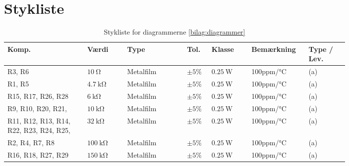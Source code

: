 \chapter{Stykliste} \label{bilag:styklister}

\begin{table}[h!]
\small
\caption{Stykliste for diagrammerne \ref{bilag:diagrammer}}
\label{tab:styklister}
\begin{threeparttable}
\begin{tabular}{p{0.2\linewidth}p{0.1\linewidth}p{0.15\linewidth}p{0.05\linewidth}p{0.1\linewidth}p{0.1\linewidth}p{0.1\linewidth}}
\toprule
\multicolumn{1}{l}{\textbf{Komp.}}       &
\multicolumn{1}{l}{\textbf{Værdi}}       &
\multicolumn{1}{l}{\textbf{Type}}       &
\multicolumn{1}{l}{\textbf{Tol.}} &
\multicolumn{1}{l}{\textbf{Klasse}} &
\multicolumn{1}{l}{\textbf{Bemærkning}} &
\multicolumn{1}{l}{\textbf{Type / Lev.}}  \\ 
\hline
R3, R6 & $\SI{10}{\ohm}$			& Metalfilm	& $\pm 5\%$ 		 & $\SI{0.25}{\watt}$	  & 100ppm/\si{\celsius}  & (a) \\
R1, R5 & $\SI{4.7}{\kilo\ohm}$			& Metalfilm	& $\pm 5\%$ 		 & $\SI{0.25}{\watt}$	  & 100ppm/\si{\celsius}  & (a) \\
R15, R17, R26, R28 & $\SI{6}{\kilo\ohm}$			& Metalfilm	& $\pm 5\%$ 		 & $\SI{0.25}{\watt}$	  & 100ppm/\si{\celsius}  & (a) \\
R9, R10, R20, R21,  & $\SI{10}{\kilo\ohm}$			& Metalfilm	& $\pm 5\%$ 		 & $\SI{0.25}{\watt}$	  & 100ppm/\si{\celsius}  & (a) \\
R11, R12, R13, R14, R22, R23, R24, R25, & $\SI{32}{\kilo\ohm}$			& Metalfilm	& $\pm 5\%$ 		 & $\SI{0.25}{\watt}$	  & 100ppm/\si{\celsius}  & (a) \\
R2, R4, R7, R8 & $\SI{100}{\kilo\ohm}$			& Metalfilm	& $\pm 5\%$ 		 & $\SI{0.25}{\watt}$	  & 100ppm/\si{\celsius}  & (a) \\
R16, R18, R27, R29 & $\SI{150}{\kilo\ohm}$			& Metalfilm	& $\pm 5\%$ 		 & $\SI{0.25}{\watt}$	  & 100ppm/\si{\celsius}  & (a) \\
\midrule

\end{tabular}
\end{threeparttable}
\end{table}
